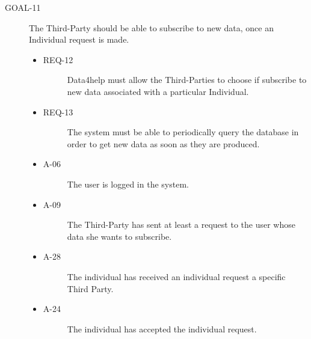 \documentclass[a4paper]{article}
\newcommand{\requirement}{\ding{229}}%
\begin{document}
                \begin{description}
        	\item[GOAL-11] The Third-Party should be able to subscribe to new data, once an Individual request is made. 
            	\begin{itemize}
            	    \item[\requirement]
                	\begin{description}
                	\item[REQ-12] Data4help must allow the Third-Parties to choose if subscribe to new data associated with a particular Individual. 
                	\end{description}
                	\item[\requirement]
                	\begin{description}
                	\item[REQ-13] The system must be able to periodically query the database in order to get new data as soon as they are produced.
                	\end{description}
                	\item
                	\begin{description}
                	\item[A-06] The user is logged in the system.
                	\end{description}
                	\item
                	\begin{description}
                	\item[A-09] The Third-Party has sent at least a request to the user whose data she wants to subscribe.
                	\end{description}
                	\item
                	\begin{description}
                	\item[A-28] The individual has received an individual request a specific Third Party.
                	\end{description}
                	\item
                	\begin{description}
                	\item[A-24] The individual has accepted the individual request.
                	\end{description}
                	\end{itemize}
        \end{description}
        
\end{document}
